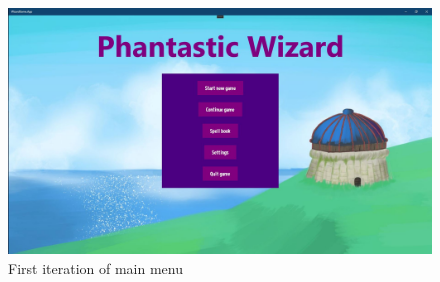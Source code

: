 \documentclass[12pt]{article}
\begin{document}
\begin{figure}[H]
    \centering
    \includegraphics[max width=\textwidth]{images/013.JPG}
    \caption{First iteration of main menu}
\end{figure}
\end{document}
